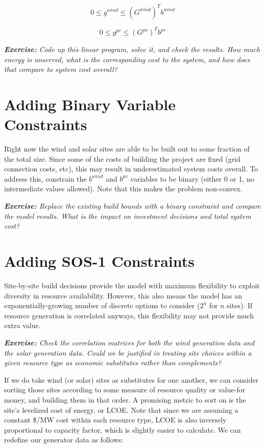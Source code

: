 \documentclass[11pt]{article}
\begin{document}
\begin{equation}
    0 \leq g^{wind} \leq (G^{wind})^T b^{wind}
\end{equation}

\begin{equation}
    0 \leq g^{pv} \leq (G^{pv})^T b^{pv}
\end{equation}

\textit{\textbf{Exercise:} Code up this linear program, solve it, and check the results. How much energy is unserved, what is the corresponding cost to the system, and how does that compare to system cost overall?}

\section{Adding Binary Variable Constraints}

Right now the wind and solar sites are able to be built out to some fraction of the total size. Since some of the costs of building the project are fixed (grid connection costs, etc), this may result in underestimated system costs overall. To address this, constrain the $b^{wind}$ and $b^{pv}$ variables to be binary (either 0 or 1, no intermediate values allowed). Note that this makes the problem non-convex.

\textit{\textbf{Exercise:} Replace the existing build bounds with a binary constraint and compare the model results. What is the impact on investment decisions and total system cost?}

\section{Adding SOS-1 Constraints}

Site-by-site build decisions provide the model with maximum flexibility to exploit diversity in resource availability. However, this also means the model has an exponentially-growing number of discrete options to consider ($2^n$ for $n$ sites). If resource generation is correlated anyways, this flexibility may not provide much extra value.

\textit{\textbf{Exercise:} Check the correlation matrices for both the wind generation data and the solar generation data. Could we be justified in treating site choices within a given resource type as economic substitutes rather than complements?}

If we do take wind (or solar) sites as substitutes for one another, we can consider sorting those sites according to some measure of resource quality or value-for money, and building them in that order. A promising metric to sort on is the site's levelized cost of energy, or LCOE. Note that since we are assuming a constant \$/MW cost within each resource type, LCOE is also inversely proportional to capacity factor, which is slightly easier to calculate. We can redefine our generator data as follows:
\end{document}
